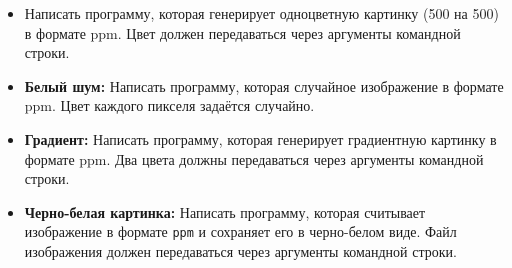 \documentclass{article}
\begin{document}
\begin{itemize}
\newpage
\begin{itemize}
\item Написать программу, которая генерирует одноцветную картинку (500 на 500) в формате ppm. Цвет должен передаваться через аргументы командной строки.
\item \textbf{Белый шум:} Написать программу, которая случайное изображение в формате ppm. Цвет каждого пикселя задаётся случайно.
\item \textbf{Градиент:} Написать программу, которая генерирует градиентную картинку в формате ppm. Два цвета должны передаваться через аргументы командной строки.
\item \textbf{Черно-белая картинка:} Написать программу, которая считывает изображение в формате \texttt{ppm} и сохраняет его в черно-белом виде. Файл изображения должен передаваться через аргументы командной строки.
\end{itemize}

\end{itemize}
\end{document}
